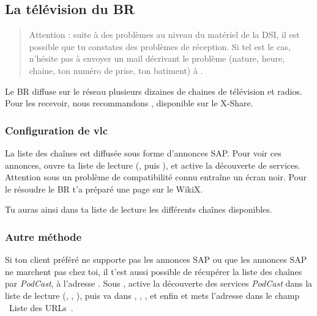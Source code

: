 
\subsection{La télévision du BR}
\label{TV}

   \begin{quote}
   Attention : suite à des problèmes au niveau du matériel de la DSI, il est possible que tu constates des problèmes de réception. Si tel est le cas, n'hésite pas à envoyer un mail décrivant le problème (nature, heure, chaine, ton numéro de prise, ton batiment) à .
   \end{quote}

Le BR diffuse sur le réseau plusieurs dizaines de chaines de télévision et radios. Pour les recevoir, nous recommandons , disponible sur le X-Share.

\subsubsection{Configuration de vlc}

La liste des cha\^ines est diffusée sous forme d'annonces SAP. Pour voir ces annonces, ouvre ta liste de lecture (, puis ), et active la découverte de services. Attention sous  un probl\`eme de compatibilité connu entra\^ine un écran noir. Pour le résoudre le BR t'a préparé une page sur le WikiX.


Tu auras ainsi dans ta liste de lecture les différents cha\^{i}nes disponibles.

\subsubsection{Autre méthode}

Si ton client préféré ne supporte pas les annonces SAP ou que les annonces SAP ne marchent pas chez toi, il t'est aussi possible de récupérer la liste des cha\^ines par
\emph{PodCast}, à l'adresse . Sous , active la découverte des services \emph{PodCast} dans la liste de
lecture (, , ), puis va dans , , ,  et enfin  et
mets l'adresse  dans le champ \guillemotleft~Liste des URLs~\guillemotright .

